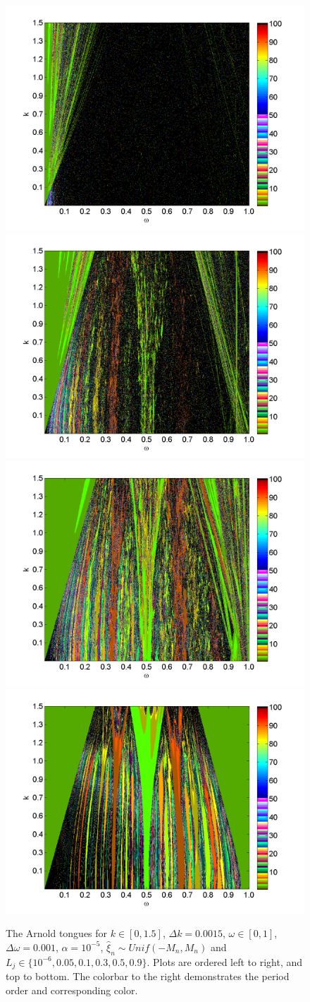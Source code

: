 \begin{figure}[H]\linespread{1}  
\caption[The Arnold tongues for the random circle map, uniform distribution]{The Arnold
  tongues for $k\in [0,1.5]$, $\Delta k = 0.0015$, $\omega \in [0,1]$,
  $\Delta \omega = 0.001$, $\alpha = 10^{-5}$, $\hat{\xi}_n\sim Unif(-M_n,M_n)$ and $L_j \in
  \{10^{-6},0.05,0.1,0.3,0.5,0.9\}$. Plots are ordered left to right, and top to bottom. The colorbar
to the right demonstrates the period order and corresponding color.}\label{fig:randtongues}
\centering
\includegraphics[width=.5\textwidth]{figs/tongues_1000_L_1e-05.png}\hfill
\includegraphics[width=.5\textwidth]{figs/tongues_1000_L_005.png}\\
\includegraphics[width=.5\textwidth]{figs/tongues_1000_L_01.png}\hfill
\includegraphics[width=.5\textwidth]{figs/tongues_1000_L_03.png}\\

\end{figure}
